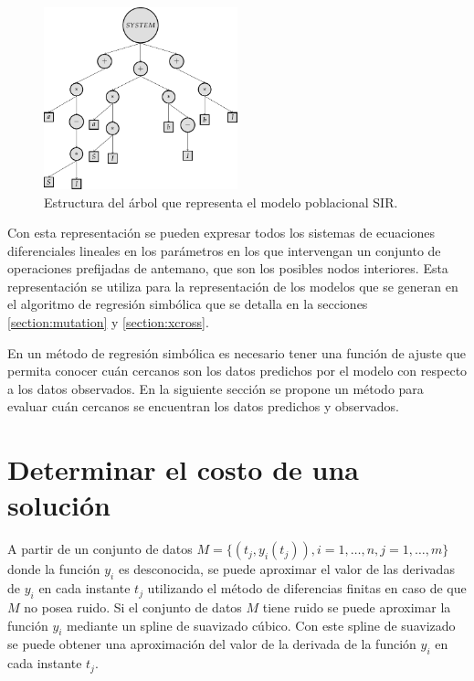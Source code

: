 \begin{figure}[h]
    \centering
    \includegraphics[width=0.5\textwidth]{"figures/sir_example.pdf"}
    \caption{Estructura del árbol que representa el modelo poblacional SIR.}
    \label{tikzpicture:sir_example}
\end{figure}

Con esta representación se pueden expresar todos los sistemas de ecuaciones diferenciales lineales en los parámetros en los que intervengan un conjunto de operaciones prefijadas de antemano, que son los posibles nodos interiores. Esta representación se utiliza para la representación de los modelos que se generan en el algoritmo de regresión simbólica que se detalla en la secciones \ref{section:mutation} y \ref{section:xcross}.

En un método de regresión simbólica es necesario tener una función de ajuste que permita conocer cuán cercanos son los datos predichos por el modelo con respecto a los datos observados. En la siguiente sección se propone un método para evaluar cuán cercanos se encuentran los datos predichos y observados.

\section{Determinar el costo de una solución}\label{section:solution_cost}

A partir de un conjunto de datos $M = \{(t_j, y_i(t_j)), i = 1, \dots, n, j = 1, \dots, m\}$ donde la función $y_i$ es desconocida, se puede aproximar el valor de las derivadas de $y_i$ en cada instante $t_j$ utilizando el método de diferencias finitas \cite{gaucel2014learning} en caso de que $M$ no posea ruido. Si el conjunto de datos $M$ tiene ruido se puede aproximar la función $y_i$ mediante un spline de suavizado cúbico. Con este spline de suavizado se puede obtener una aproximación del valor de la derivada de la función $y_i$ en cada instante $t_j$.

